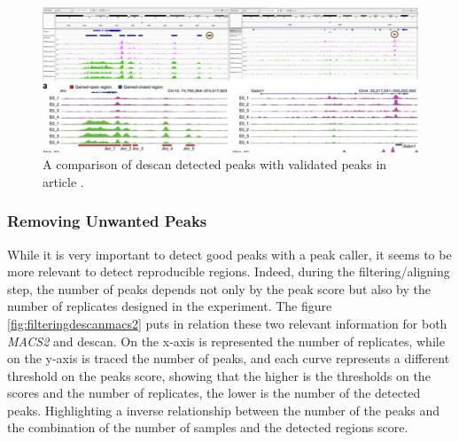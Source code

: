 \begin{figure}[H]
\includegraphics[width=\textwidth, keepaspectratio]{img/descan2/peaks.png}
\caption[\gls{descan} peaks detection]{A comparison of \gls{descan} detected peaks with validated peaks in article \cite{Su2017}.}
\label{fig:peaksdescan}
\centering
\end{figure}

\subsubsection{Removing Unwanted Peaks}

While it is very important to detect good peaks with a peak caller, it seems to be more relevant to detect reproducible regions. 
Indeed, during the filtering/aligning step, the number of peaks depends not only by the peak score but also by the number of replicates designed in the experiment.
The figure \ref{fig:filteringdescanmacs2} puts in relation these two relevant information for both \textit{MACS2} and \gls{descan}. 
On the x-axis is represented the number of replicates, while on the y-axis is traced the number of peaks, and each curve represents a different threshold on the peaks score, showing that the higher is the thresholds on the scores and the number of replicates, the lower is the number of the detected peaks.
Highlighting a inverse relationship between the number of the peaks and the combination of the number of samples and the detected regions score.

